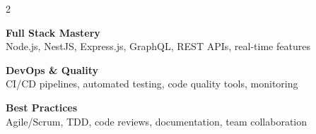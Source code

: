 \documentclass[10pt,a4paper]{article}
\begin{document}
\begin{multicols}{2}
{\vspace{3pt}
\textbf{Full Stack Mastery}\\[1pt]
Node.js, NestJS, Express.js, GraphQL, REST APIs, real-time features

\vspace{3pt}
\textbf{DevOps \& Quality}\\[1pt]
CI/CD pipelines, automated testing, code quality tools, monitoring

\vspace{3pt}
\textbf{Best Practices}\\[1pt]
Agile/Scrum, TDD, code reviews, documentation, team collaboration
}

\end{multicols}
\end{document}
